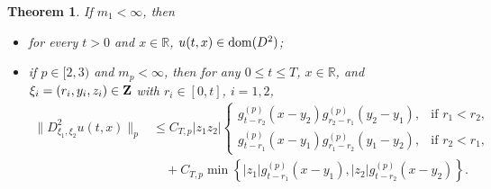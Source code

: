\documentclass[12pt]{article}
\newtheorem{theorem}{Theorem}[section]
\def\bR{\mathbb{R}}
\begin{document}
\begin{theorem}
\label{key-th-D2u}
If $m_1<\infty$, then
\begin{itemize}
\item[(i)] for every $t>0$ and $x\in\bR$, $u(t,x)\in{\rm dom}(D^2)$;
\item[(ii)] if $p\in[2,3)$ and $m_p<\infty$, then for any
$0\le t\le T$, $x\in\bR$, and
$\xi_i=(r_i,y_i,z_i)\in{\bf Z}$ with $r_i\in[0,t]$, $i=1,2$,
\begin{equation}
\label{D2u-nonlinear-bound}
\begin{aligned}
\|D^2_{\xi_1,\xi_2}u(t,x)\|_p
&\le
C_{T,p}|z_1z_2|
\begin{cases}
g_{t-r_2}^{(p)}(x-y_2)
g_{r_2-r_1}^{(p)}(y_2-y_1),
& \text{if } r_1<r_2, \\[0.3em]
g_{t-r_1}^{(p)}(x-y_1)
g_{r_1-r_2}^{(p)}(y_1-y_2),
& \text{if } r_2<r_1,
\end{cases}
\\
&\quad+
C_{T,p}
\min\left\{
|z_1|g_{t-r_1}^{(p)}(x-y_1),
|z_2|g_{t-r_2}^{(p)}(x-y_2)
\right\}.
\end{aligned}
\end{equation}
\end{itemize}
\end{theorem}
\end{document}
